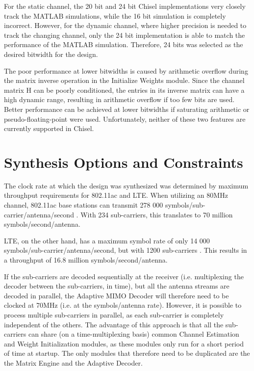 \documentclass[journal]{IEEEtran}
\begin{document}
For the static channel, the 20 bit and 24 bit Chisel implementations very closely track the MATLAB simulations, while the 16 bit simulation is completely incorrect. However, for the dynamic channel, where higher precision is needed to track the changing channel, only the 24 bit implementation is able to match the performance of the MATLAB simulation. Therefore, 24 bits was selected as the desired bitwidth for the design.

The poor performance at lower bitwidths is caused by arithmetic overflow during the matrix inverse operation in the Initialize Weights module. Since the channel matrix H can be poorly conditioned, the entries in its inverse matrix can have a high dynamic range, resulting in arithmetic overflow if too few bits are used. Better performance can be achieved at lower bitwidths if saturating arithmetic or pseudo-floating-point were used. Unfortunately, neither of these two features are currently supported in Chisel.


\section{Synthesis Options and Constraints}

The clock rate at which the design was synthesized was determined by maximum throughput requirements for 802.11ac and LTE. When utilizing an 80MHz channel, 802.11ac base stations can transmit 278 000 symbols/sub-carrier/antenna/second \cite{802_11_ac_handbook}. With 234 sub-carriers, this translates to 70 million symbols/second/antenna.

LTE, on the other hand, has a maximum symbol rate of only 14 000 symbols/sub-carrier/antenna/second, but with 1200 sub-carriers \cite{lte_webpage}. This results in a throughput of 16.8 million symbols/second/antenna.

If the sub-carriers are decoded sequentially at the receiver (i.e. multiplexing the decoder between the sub-carriers, in time), but all the antenna streams are decoded in parallel, the Adaptive MIMO Decoder will therefore need to be clocked at 70MHz (i.e. at the symbols/antenna rate). However, it is possible to process multiple sub-carriers in parallel, as each sub-carrier is completely independent of the others. The advantage of this approach is that all the sub-carriers can share (on a time-multiplexing basis) common Channel Estimation and Weight Initialization modules, as these modules only run for a short period of time at startup. The only modules that therefore need to be duplicated are the the Matrix Engine and the Adaptive Decoder.
\end{document}
